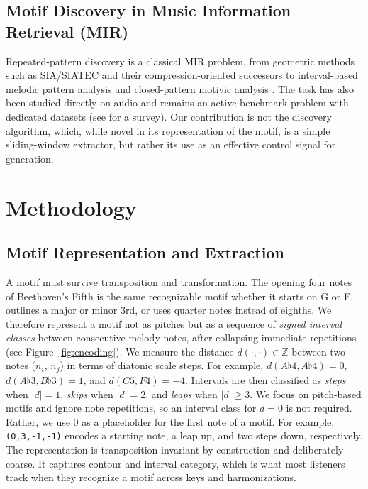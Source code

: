\documentclass{article}
\newcommand{\motif}[1]{\texttt{(#1)}}
\begin{document}
\subsection*{Motif Discovery in Music Information Retrieval (MIR)} 

Repeated-pattern discovery is a classical MIR problem, from geometric methods such as SIA/SIATEC \citep{meredith2002algorithms} and their compression-oriented successors \citep{collins2013siarct} to interval-based melodic pattern analysis \citep{conklin2001patterns} and closed-pattern motivic analysis \citep{lartillot2005efficient}. The task has also been studied directly on audio \citep{nieto2014identifying} and remains an active benchmark problem with dedicated datasets \citep{hsiao2023bps} (see \citet{janssen2013discovering} for a survey). Our contribution is not the discovery algorithm, which, while novel in its representation of the motif, is a simple sliding-window extractor, but rather its use as an effective control signal for generation.

\section{Methodology}
\label{sec:method}

\subsection{Motif Representation and Extraction}
\label{sec:representation}

A motif must survive transposition and transformation. The opening four notes of Beethoven's Fifth is the same recognizable motif whether it starts on G or F, outlines a major or minor 3rd, or uses quarter notes instead of eighths. We therefore represent a motif not as pitches but as a sequence of \emph{signed interval classes} between consecutive melody notes, after collapsing immediate repetitions (see Figure~\ref{fig:encoding}). We measure the distance $d(\cdot,\cdot)\in\mathbb{Z}$ between two notes ($n_i$, $n_j$) in terms of diatonic scale steps. For example, $d(A\flat4,A\flat4)=0$, $d(A\flat3,B\flat3)=1$, and $d(C5,F4)=-4$. Intervals are then classified as \textit{steps} when $|d|=1$, \textit{skips} when $|d|=2$, and \textit{leaps} when $|d|\geq3$. We focus on pitch-based motifs and ignore note repetitions, so an interval class for $d=0$ is not required. Rather, we use 0 as a placeholder for the first note of a motif. For example, \motif{0,3,-1,-1} encodes a starting note, a leap up, and two steps down, respectively. The representation is transposition-invariant by construction and deliberately coarse. It captures contour and interval category, which is what most listeners track when they recognize a motif across keys and harmonizations.
\end{document}
